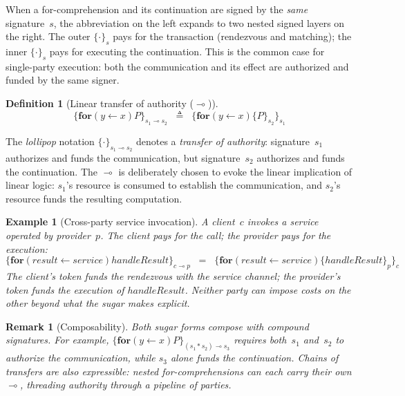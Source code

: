 \documentclass[11pt,a4paper]{article}
\newtheorem{definition}[theorem]{Definition}
\newtheorem{remark}[theorem]{Remark}
\newtheorem{example}[theorem]{Example}
\newcommand{\forc}{\mathbf{for}}
\newcommand{\recv}[3]{\forc\!\left( #1 \leftarrow #2 \right) #3}
\newcommand{\signed}[2]{\{#1\}_{#2}}
\newcommand{\comp}{\mathbin{*}}
\begin{document}
\noindent
When a for-comprehension and its continuation are signed by
the \emph{same} signature~$s$, the abbreviation on the left
expands to two nested signed layers on the right.  The outer
$\signed{\cdot}{s}$ pays for the transaction (rendezvous and
matching); the inner $\signed{\cdot}{s}$ pays for executing
the continuation.  This is the common case for single-party
execution: both the communication and its effect are
authorized and funded by the same signer.

\begin{definition}[Linear transfer of authority ($\multimap$)]
  \label{def:sugar-lollipop}
  \begin{equation}
    \signed{\recv{y}{x}{P}}{s_1 \multimap s_2}
    \;\;\triangleq\;\;
    \signed{
      \recv{y}{x}{\signed{P}{s_2}}
    }{s_1}
    \label{eq:sugar-lollipop}
  \end{equation}
\end{definition}

\noindent
The \emph{lollipop} notation
$\signed{\cdot}{s_1 \multimap s_2}$ denotes a
\emph{transfer of authority}: signature~$s_1$ authorizes and
funds the communication, but signature~$s_2$ authorizes and
funds the continuation.  The $\multimap$ is deliberately
chosen to evoke the linear implication of linear logic:
$s_1$'s resource is consumed to establish the communication,
and $s_2$'s resource funds the resulting computation.

\begin{example}[Cross-party service invocation]
  \label{ex:cross-party}
  A client~$c$ invokes a service operated by provider~$p$.
  The client pays for the call; the provider pays for the
  execution:
  \[
    \signed{
      \recv{\mathit{result}}{\mathit{service}}{\mathit{handleResult}}
    }{c \multimap p}
    \;\;=\;\;
    \signed{
      \recv{\mathit{result}}{\mathit{service}}{
        \signed{\mathit{handleResult}}{p}
      }
    }{c}
  \]
  The client's token funds the rendezvous with the service
  channel; the provider's token funds the execution of
  $\mathit{handleResult}$.  Neither party can impose costs
  on the other beyond what the sugar makes explicit.
\end{example}

\begin{remark}[Composability]
  Both sugar forms compose with compound signatures.  For
  example,
  $\signed{\recv{y}{x}{P}}{(s_1 \comp s_2) \multimap s_3}$
  requires both~$s_1$ and~$s_2$ to authorize the
  communication, while $s_3$ alone funds the continuation.
  Chains of transfers are also expressible:
  nested for-comprehensions can each carry their own
  $\multimap$, threading authority through a pipeline of
  parties.
\end{remark}
\end{document}
